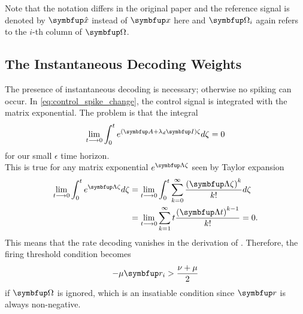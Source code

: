Note that the notation differs in the original paper and the reference signal is denoted by $\bmu{\hat{x}}$ instead of $\bmu{x}$ here and $\bmu{\Omega}_i$ again refers to the $i$-th column of $\bmu{\Omega}$.
\subsection{The Instantaneous Decoding Weights}
The presence of instantaneous decoding is necessary; otherwise no spiking can occur. In \cref{eq:control_spike_change}, the control signal is integrated with the matrix exponential. The problem is that the integral
\begin{equation}
	\lim_{t\longrightarrow 0 } \int_0^t e^{(\bmu{A}+\lambda_d\bmu{I})\zeta}d\zeta = 0
\end{equation}
for our small $\epsilon$ time horizon.\\
This is true for any matrix exponential $e^{\bmu{\Lambda}\zeta}$ seen by Taylor expansion
\begin{equation}
	\begin{aligned}
	\lim_{t\longrightarrow 0 }\int_0^t e^{\bmu{\Lambda}\zeta}d\zeta &= \lim_{t\longrightarrow 0 } \int_0^t \sum_{k=0}^\infty \frac{\left(\bmu{\Lambda}\zeta\right)^k}{k!} d\zeta\\
	&=\lim_{t\longrightarrow 0 }\sum_{k=1}^\infty t\frac{\left(\bmu{\Lambda}t\right)^{k-1}}{k!} = 0.
	\end{aligned}
\end{equation}
This means that the rate decoding vanishes in the derivation of . Therefore, the firing threshold condition becomes
\begin{equation}
	-\mu \bmu{r}_i > \frac{\nu  + \mu}{2}
\end{equation}
if $\bmu{\Omega}$ is ignored, which is an insatiable condition since $\bmu{r}$ is always non-negative.
